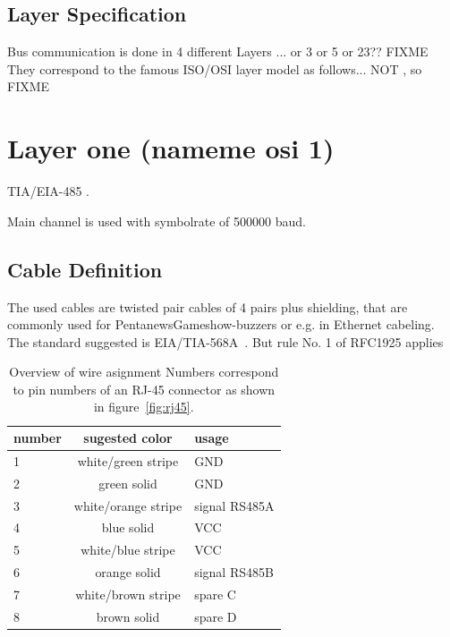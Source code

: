 \documentclass[a4paper,12pt]{scrartcl}
\begin{document}
\subsection{Layer Specification}
Bus communication is done in 4 different Layers ... or 3 or 5 or 23?? FIXME
They correspond to the famous ISO/OSI layer model as follows... NOT , so FIXME


\section{Layer one (nameme osi 1)}
TIA/EIA-485 \cite{EIA485}.

Main channel is used with symbolrate of 500000 baud. 



\subsection{Cable Definition}
The used cables are twisted pair cables of 4 pairs plus shielding, that are commonly used for  PentanewsGameshow-buzzers or e.g. in Ethernet cabeling.
The standard suggested is EIA/TIA-568A~\cite{EIA568}.
But rule No. 1 of RFC1925 \cite{RFC1925} applies

\begin{table}
	\centering
	\begin{tabular}{l c l}
		number        & sugested color      & usage \\
		\hline
		1             & white/green stripe  &   GND \\
		2             & green solid         &   GND \\
		3             & white/orange stripe &   signal RS485A\\
		4             & blue solid          &   VCC \\
		5             & white/blue stripe   &   VCC \\
		6             & orange solid        &   signal RS485B\\
		7             & white/brown stripe  &   spare C \\
		8             & brown solid         &   spare D \\
	\end{tabular}
	\caption{%
	Overview of wire asignment  \newline%
	Numbers correspond to pin numbers of an RJ-45 connector as shown in figure~\ref{fig:rj45}.
	}
	\label{tab:wires}
\end{table}
\end{document}
